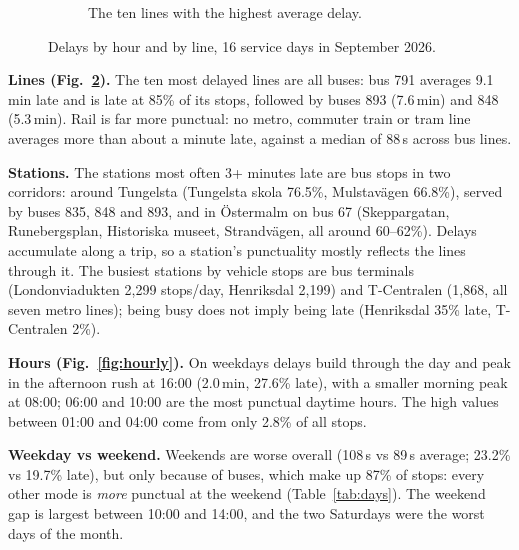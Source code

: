 \documentclass[10pt,a4paper]{article}
\begin{document}
\begin{figure}[h]
\begin{subfigure}[t]{0.49\linewidth}
\caption{The ten lines with the highest average delay.}
\label{fig:lines}
\end{subfigure}
\caption{Delays by hour and by line, 16 service days in September 2026.}
\vspace{-6pt}
\end{figure}

\textbf{Lines (Fig.~\ref{fig:lines}).} The ten most delayed lines are all buses: bus 791 averages
9.1\,min late and is late at 85\% of its stops, followed by buses 893 (7.6\,min) and 848 (5.3\,min).
Rail is far more punctual: no metro, commuter train or tram line averages more than about a minute late,
against a median of 88\,s across bus lines.

\textbf{Stations.} The stations most often 3+ minutes late are bus stops in two corridors: around
Tungelsta (Tungelsta skola 76.5\%, Mulstavägen 66.8\%), served by buses 835, 848 and 893, and in
Östermalm on bus 67 (Skeppargatan, Runebergsplan, Historiska museet, Strandvägen, all around 60--62\%).
Delays accumulate along a trip, so a station's punctuality mostly reflects the lines through it. The
busiest stations by vehicle stops are bus terminals (Londonviadukten 2,299 stops/day, Henriksdal 2,199)
and T-Centralen (1,868, all seven metro lines); being busy does not imply being late (Henriksdal 35\%
late, T-Centralen 2\%).

\textbf{Hours (Fig.~\ref{fig:hourly}).} On weekdays delays build through the day and peak in the afternoon
rush at 16:00 (2.0\,min, 27.6\% late), with a smaller morning peak at 08:00; 06:00 and 10:00 are the most
punctual daytime hours. The high values between 01:00 and 04:00 come from only 2.8\% of all stops.

\textbf{Weekday vs weekend.} Weekends are worse overall (108\,s vs 89\,s average; 23.2\% vs 19.7\% late),
but only because of buses, which make up 87\% of stops: every other mode is \emph{more} punctual at the
weekend (Table~\ref{tab:days}). The weekend gap is largest between 10:00 and 14:00, and the two Saturdays
were the worst days of the month.
\end{document}
